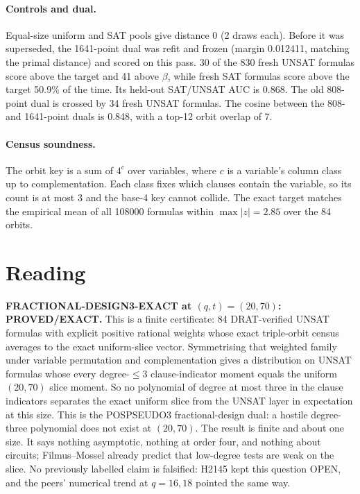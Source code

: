 \documentclass[11pt]{article}
\begin{document}
\paragraph{Controls and dual.} Equal-size uniform and SAT pools give distance 0 (2 draws each). Before it was superseded, the 1641-point dual was refit and frozen (margin 0.012411, matching the primal distance) and scored on this pass. 30 of the 830 fresh UNSAT formulas score above the target and 41 above $\beta$, while fresh SAT formulas score above the target 50.9\% of the time. Its held-out SAT/UNSAT AUC is 0.868. The old 808-point dual is crossed by 34 fresh UNSAT formulas. The cosine between the 808- and 1641-point duals is 0.848, with a top-12 orbit overlap of 7.

\paragraph{Census soundness.} The orbit key is a sum of $4^{c}$ over variables, where $c$ is a variable's column class up to complementation. Each class fixes which clauses contain the variable, so its count is at most 3 and the base-4 key cannot collide. The exact target matches the empirical mean of all 108000 formulas within $\max|z|=2.85$ over the 84 orbits.

\section*{Reading}
\textbf{FRACTIONAL-DESIGN3-EXACT at $(q,t)=(20,70)$: PROVED/EXACT.} This is a finite certificate: 84 DRAT-verified UNSAT formulas with explicit positive rational weights whose exact triple-orbit census averages to the exact uniform-slice vector. Symmetrising that weighted family under variable permutation and complementation gives a distribution on UNSAT formulas whose every degree-$\le3$ clause-indicator moment equals the uniform $(20,70)$ slice moment. So no polynomial of degree at most three in the clause indicators separates the exact uniform slice from the UNSAT layer in expectation at this size. This is the POSPSEUDO3 fractional-design dual: a hostile degree-three polynomial does not exist at $(20,70)$. The result is finite and about one size. It says nothing asymptotic, nothing at order four, and nothing about circuits; Filmus--Mossel already predict that low-degree tests are weak on the slice. No previously labelled claim is falsified: H2145 kept this question OPEN, and the peers' numerical trend at $q=16,18$ pointed the same way.
\end{document}
